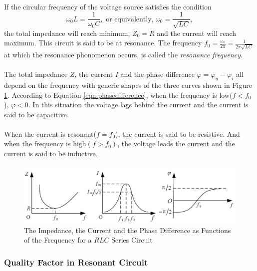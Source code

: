 \documentclass{my_template}
\renewcommand{\phi}{\varphi}
\begin{document}
    \paragraph{} If the circular frequency of the voltage source satisfies the condition \[\omega_0L=\frac{1}{\omega_0C},\text{ or equivalently, }\omega_0=\frac{1}{\sqrt{LC}},\] the total impedance will reach minimum, $Z_0=R$ and the current will reach maximum. This circuit is said to be at resonance. The frequency $f_0=\frac{\omega_0}{2\pi}=\frac{1}{2\pi\sqrt{LC}}$ at which the resonance phonomenon occurs, is called the \emph{resonance frequency}.
    \vspace{-5mm}
    \paragraph{} The total impedance $Z$, the current $I$ and the phase difference $\phi=\phi_u-\phi_i$ all depend on the frequency with generic shapes of the three curves shown in Figure \ref{fig:3figures}. According to Equation \ref{eqn:phasedifference}, when the frequency is low($f<f_0$), $\phi<0$. In this situation the voltage lags behind the current and the current is said to be capacitive.
    \vspace{-5mm}
    \paragraph{} When the current is resonant($f=f_0$), the current is said to be resistive. And when the frequency is high$(f>f_0)$, the voltage leads the current and the current is said to be inductive.
    \begin{figure}[H]
        \centering
        \includegraphics[width=\textwidth]{fig/3figures.png}
        \caption{The Impedance, the Current and the Phase Difference as Functions of the Frequency for a $RLC$ Series Circuit}
        \label{fig:3figures}
    \end{figure}
    \subsubsection{Quality Factor in Resonant Circuit}
\end{document}
